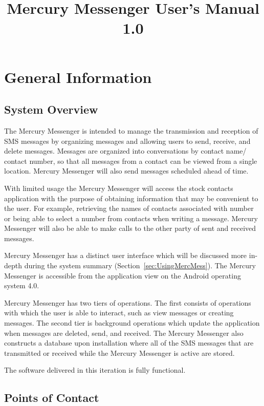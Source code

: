 \documentclass{article}
\begin{document}
\title{Mercury Messenger User's Manual 1.0}
\maketitle

\tableofcontents

\section{General Information}

\subsection{System Overview}
\par The Mercury Messenger is intended to manage the transmission and reception of SMS messages by organizing messages and allowing users to send, receive, and delete messages. Messages are organized into conversations by contact name/ contact number, so that all messages from a contact can be viewed from a single location.  Mercury Messenger will also send messages scheduled ahead of time.
\par With limited usage the Mercury Messenger will access the stock contacts application with the purpose of obtaining information that may be convenient to the user. For example, retrieving the names of contacts associated with number or being able to select a number from contacts when writing a message. Mercury Messenger will also be able to make calls to the other party of sent and received messages.
\par Mercury Messenger has a distinct user interface which will be discussed more in-depth during the system summary (Section~\ref{sec:UsingMercMess}). The Mercury Messenger is accessible from the application view on the Android operating system 4.0.
\par Mercury Messenger has two tiers of operations. The first consists of operations with which the user is able to interact, such as view messages or creating messages. The second tier is background operations which update the application when messages are deleted, send, and received. The Mercury Messenger also constructs a database upon installation where all of the SMS messages that are transmitted or received while the Mercury Messenger is active are stored.
\par The software delivered in this iteration is fully functional.


\subsection{Points of Contact}
\end{document}
